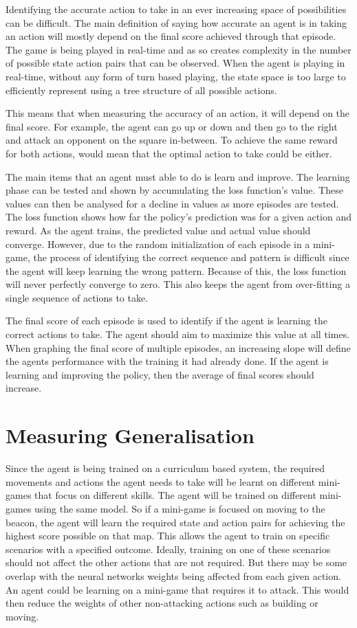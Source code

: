 Identifying the accurate action to take in an ever increasing space of
possibilities can be difficult. The main definition of saying how accurate an
agent is in taking an action will mostly depend on the final score achieved
through that episode. The game is being played in real-time and as so creates
complexity in the number of possible state action pairs that can be observed.
When the agent is playing in real-time, without any form of turn based playing,
the state space is too large to efficiently represent using a tree structure of
all possible actions.

This means that when measuring the accuracy of an action, it will depend
on the final score. For example, the agent can go up or down and then go to the
right and attack an opponent on the square in-between. To achieve the same
reward for both actions, would mean that the optimal action to take could be
either.

The main items that an agent must able to do is learn and improve. The learning
phase can be tested and shown by accumulating the loss function's value. These
values can then be analysed for a decline in values as more episodes are tested.
The loss function shows how far the policy's prediction was for a given action
and reward. As the agent trains, the predicted value and actual value should
converge. However, due to the random initialization of each episode in a
mini-game, the process of identifying the correct sequence and pattern is
difficult since the agent will keep learning the wrong pattern. Because of this,
the loss function will never perfectly converge to zero. This also keeps the
agent from over-fitting a single sequence of actions to take.

The final score of each episode is used to identify if the agent is learning the
correct actions to take. The agent should aim to maximize this value at all
times. When graphing the final score of multiple episodes, an increasing slope
will define the agents performance with the training it had already done. If the
agent is learning and improving the policy, then the average of final scores
should increase.

\section{Measuring Generalisation}

Since the agent is being trained on a curriculum based system, the required
movements and actions the agent needs to take will be learnt on different
mini-games that focus on different skills. The agent will be trained on
different mini-games using the same model. So if a mini-game is focused on
moving to the beacon, the agent will learn the required state and action pairs
for achieving the highest score possible on that map. This allows the agent to
train on specific scenarios with a specified outcome. Ideally, training on one
of these scenarios should not affect the other actions that are not required.
But there may be some overlap with the neural networks weights being affected
from each given action. An agent could be learning on a mini-game that requires
it to attack. This would then reduce the weights of other non-attacking actions
such as building or moving.

